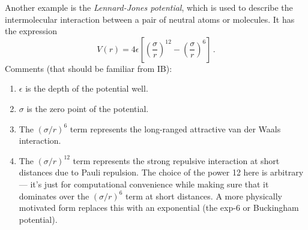 \documentclass{article}
\theoremstyle{plain}\theoremheaderfont{\normalfont\itshape}\theorembodyfont{\rmfamily}\theoremseparator{.}\newtheorem*{rem}{Remark}\newtheorem*{ex}{Example}\newtheorem*{proof}{Proof}\newtheorem*{altp}{Alternative proof}
\theoremstyle{plain}\theoremheaderfont{\normalfont\bfseries}\theorembodyfont{\rmfamily}\theoremseparator{.}\newtheorem{thm}{Theorem}[section]\newtheorem{lem}[thm]{Lemma}\newtheorem{prop}[thm]{Proposition}\newtheorem*{cor}{Corollary}\newtheorem{defn}[thm]{Definition}\newtheorem{clm}[thm]{Claim}\newtheorem{clminproof}{Claim}\newtheorem{pos}{Postulate}[section]
\theoremstyle{break}\theoremheaderfont{\normalfont\itshape}\theorembodyfont{\rmfamily}\theoremseparator{.\medskip}\newtheorem*{proofskip}{Proof}\newtheorem*{exs}{Examples}\newtheorem*{rems}{Remarks}
\theoremstyle{break}\theoremheaderfont{\normalfont\bfseries}\theorembodyfont{\rmfamily}\theoremseparator{.\medskip}\newtheorem{lemskip}[thm]{Lemma}\newtheorem{defnskip}[thm]{Definition}\newtheorem{propskip}[thm]{Proposition}\newtheorem{thmskip}[thm]{Theorem}
\numberwithin{equation}{section}
\begin{document}
    Another example is the \textit{Lennard-Jones potential}, which is used to describe the intermolecular interaction between a pair of neutral atoms or molecules. It has the expression
    \begin{equation}
        V(r)=4\epsilon\left[\left(\frac{\sigma}{r}\right)^{12}-\left(\frac{\sigma}{r}\right)^6\right]\,.
    \end{equation}
    Comments (that should be familiar from IB):
    \begin{enumerate}[topsep=0pt,label=(\roman*)]
        \item \(\epsilon\) is the depth of the potential well.
        \item \(\sigma\) is the zero point of the potential.
        \item The \((\sigma/r)^6\) term represents the long-ranged attractive van der Waals interaction.
        \item The \((\sigma/r)^{12}\) term represents the strong repulsive interaction at short distances due to Pauli repulsion. The choice of the power 12 here is arbitrary --- it's just for computational convenience while making sure that it dominates over the \((\sigma/r)^6\) term at short distances. A more physically motivated form replaces this with an exponential (the exp-6 or Buckingham potential).
    \end{enumerate}
\end{document}
